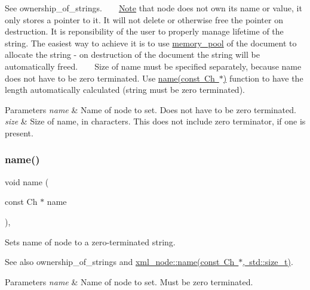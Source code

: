 See ownership\+\_\+of\+\_\+strings. ~\newline
~\newline
 \mbox{\hyperlink{classNote}{Note}} that node does not own its name or value, it only stores a pointer to it. It will not delete or otherwise free the pointer on destruction. It is reponsibility of the user to properly manage lifetime of the string. The easiest way to achieve it is to use \mbox{\hyperlink{classrapidxml_1_1memory__pool}{memory\+\_\+pool}} of the document to allocate the string -\/ on destruction of the document the string will be automatically freed. ~\newline
~\newline
 Size of name must be specified separately, because name does not have to be zero terminated. Use \mbox{\hyperlink{classrapidxml_1_1xml__base_ae099c291e104a0d277307fe71f5e0f9e}{name(const Ch $\ast$)}} function to have the length automatically calculated (string must be zero terminated). 
\begin{DoxyParams}{Parameters}
{\em name} & Name of node to set. Does not have to be zero terminated. \\
\hline
{\em size} & Size of name, in characters. This does not include zero terminator, if one is present. \\
\hline
\end{DoxyParams}
\mbox{\label{classrapidxml_1_1xml__base_ae099c291e104a0d277307fe71f5e0f9e}} 
\subsubsection{\texorpdfstring{name()}{name()}\hspace{0.1cm}{\footnotesize\ttfamily [3/3]}}
{\footnotesize\ttfamily void name (\begin{DoxyParamCaption}\item[{const Ch $\ast$}]{name }\end{DoxyParamCaption})\hspace{0.3cm}{\ttfamily [inline]}, {\ttfamily [inherited]}}



Sets name of node to a zero-\/terminated string. 

See also ownership\+\_\+of\+\_\+strings and \mbox{\hyperlink{classrapidxml_1_1xml__base_a4e7e23d06d48126c65b1f6266acfba5c}{xml\+\_\+node\+::name(const Ch $\ast$, std\+::size\+\_\+t)}}. 
\begin{DoxyParams}{Parameters}
{\em name} & Name of node to set. Must be zero terminated. \\
\hline
\end{DoxyParams}
\mbox{\label{classrapidxml_1_1xml__base_ad01e2eff02202b130baad012d1ed7328}} 
